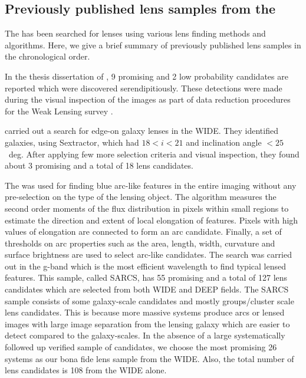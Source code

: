 \documentclass[useAMS,usenatbib,a4paper]{mn2e}
\begin{document}
\subsection{Previously published lens samples from the \cfhtls}
\label{sec:data:kls}

The \cfhtls has been searched for lenses using various lens finding
methods and algorithms. Here, we give a brief summary of previously published lens
samples in the chronological order.

In the thesis dissertation of \citet{Thanjavur2009}, 9 promising and 2
low probability candidates are reported which were discovered
serendipitiously. These detections were made during the visual
inspection of the \cfhtls images as part of data reduction procedures
for the Weak Lensing survey \citep{Benjamin2007}.

\citet{Sygnet2010} carried out a search for edge-on galaxy lenses in the
\cfhtls WIDE. They identified galaxies, using {\sc Sextractor}, which
had $18<i<21$ and inclination angle $<25$~deg. After applying few more
selection criteria and visual inspection, they found about 3 promising
and a total of 18 lens candidates.

The \af \citep{More2012} was used for finding blue arc-like features in
the entire \cfhtls imaging without any pre-selection on the type of the lensing
object. The algorithm measures the second order moments of the flux distribution
in pixels within small regions to estimate the direction and extent of local
elongation of features. Pixels with high values of elongation are connected to
form an arc candidate. Finally, a set of thresholds on arc properties such as
the area, length, width, curvature and surface brightness are used to select
arc-like candidates. The search was carried out in the g-band which is the most
efficient wavelength to find typical lensed features.  This sample, called
SARCS, has 55 promising and a total of 127 lens candidates which are selected
from both \cfhtls WIDE and DEEP fields. The SARCS sample consists of some
galaxy-scale candidates and mostly groups/cluster scale lens candidates. This is
because more massive systems produce arcs or lensed images with large image
separation from the lensing galaxy which are easier to detect compared to the
galaxy-scales. In the absence of a large systematically followed up
verified sample of candidates, we choose the most promising 26 systems
as our bona fide lens sample from the \cfhtls WIDE. Also, the total
number of lens candidates is 108 from the \cfhtls WIDE alone. 
\end{document}
